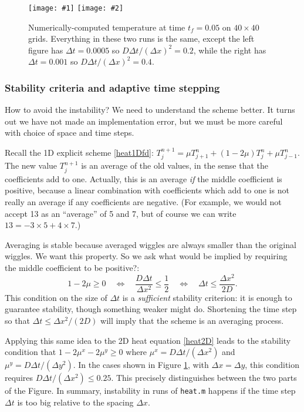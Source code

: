 \documentclass[titlepage,a4paper,final,12pt]{scrartcl}
\newcommand{\twofigsizes}[5]{
\begin{figure}[ht]
\centering
\texttt{[image: \#1]} \quad
\texttt{[image: \#2]}
\caption{#3}
\label{fig:#1}
\end{figure}}
\newcommand{\twofig}[3]{\twofigsizes{#1}{#2}{#3}{2.5in}{2.5in}}
\begin{document}
\twofig{stability}{instability}{Numerically-computed temperature at time $t_f=0.05$ on $40\times 40$ grids.  Everything in these two runs is the same, except the left figure has $\Delta t=0.0005$ so $D\Delta t/(\Delta x)^2= 0.2$, while the right has $\Delta t=0.001$ so $D\Delta t/(\Delta x)^2= 0.4$.}

\subsubsection*{Stability criteria and adaptive time stepping}  How to avoid the instability?  We need to understand the scheme better.  It turns out we have not made an implementation error, but we must be more careful with choice of space and time steps.

Recall the 1D explicit scheme \eqref{heat1Dfd}: $T_j^{n+1} = \mu T_{j+1}^n + (1 - 2 \mu) T_j^n + \mu T_{j-1}^n$.  The new value $T_j^{n+1}$ is an average of the old values, in the sense that the coefficients add to one.  Actually, this is an average \emph{if} the middle coefficient is positive, because a linear combination with coefficients which add to one is not really an average if any coefficients are negative.  (For example, we would not accept 13 as an ``average'' of 5 and 7, but of course we can write $13 = -3 \times 5 + 4 \times 7$.)

Averaging is stable because averaged wiggles are always smaller than the original wiggles.  We want this property.  So we ask what would be implied by requiring the middle coefficient to be positive?:
\begin{equation}
   1 - 2 \mu \ge 0 \quad \iff \quad \frac{D\Delta t}{\Delta x^2} \le \frac{1}{2} \quad \iff \quad \Delta t \le \frac{\Delta x^2}{2 D}.  \label{stabcrit}
\end{equation}
This condition on the size of $\Delta t$ is a \emph{sufficient} stability criterion: it is enough to guarantee stability, though something weaker might do.  Shortening the time step so that $\Delta t \le \Delta x^2/(2 D)$ will imply that the scheme is an averaging process.

Applying this same idea to the 2D heat equation \eqref{heat2D} leads to the stability condition that $1-2\mu^x-2\mu^y \ge 0$ where $\mu^x = D \Delta t / (\Delta x^2)$ and $\mu^y = D \Delta t / (\Delta y^2)$.  In the cases shown in Figure  \ref{fig:stability}, with $\Delta x=\Delta y$, this condition requires $D \Delta t /(\Delta x^2) \le 0.25$.  This precisely distinguishes between the two parts of the Figure.  In summary, instability in runs of \texttt{heat.m} happens if the time step $\Delta t$ is too big relative to the spacing $\Delta x$.
\end{document}
